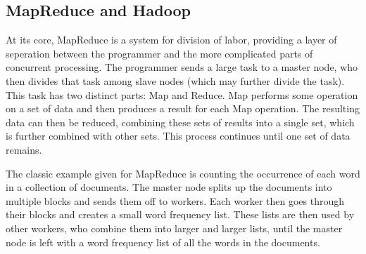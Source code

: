 \documentclass[10pt, conference, compsocconf]{IEEEtran}
\begin{document}






\subsection{MapReduce and Hadoop}
At its core, MapReduce \cite{mapreduce} is a system for division of labor, providing a layer of seperation between the programmer and the more complicated parts of concurrent processing.  The programmer sends a large task to a master node, who then divides that task among slave nodes (which may further divide the task).  This task has two distinct parts: Map and Reduce.  Map performs some operation on a set of data and then produces a result for each Map operation.  The resulting data can then be reduced, combining these sets of results into a single set, which is further combined with other sets.  This process continues until one set of data remains.

The classic example given for MapReduce is counting the occurrence of each word in a collection of documents.  The master node splits up the documents into multiple blocks and sends them off to workers.  Each worker then goes through their blocks and creates a small word frequency list.  These lists are then used by other workers, who combine them into larger and larger lists, until the master node is left with a word frequency list of all the words in the documents. 
\end{document}
